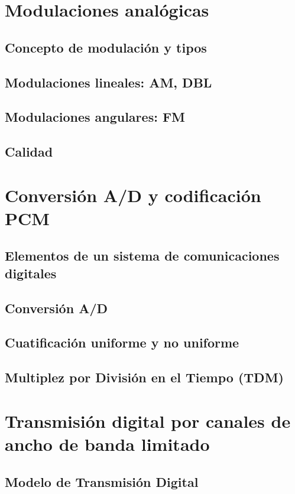 \documentclass[a4paper]{book}
\begin{document}
\chapter{Modulaciones analógicas}
\section{Concepto de modulación y tipos}
\section{Modulaciones lineales: AM, DBL}
\section{Modulaciones angulares: FM}
\section{Calidad}

\chapter{Conversión A/D y codificación PCM}
\section{\texorpdfstring{Elementos de un sistema de comunicaciones\\ digitales}{Elementos de un sistema de comunicaciones digitales}}
\section{Conversión A/D}
\section{Cuatificación uniforme y no uniforme}
\section{Multiplez por División en el Tiempo (TDM)}

\chapter{Transmisión digital por canales de ancho de banda limitado}
\section{Modelo de Transmisión Digital}
\end{document}
